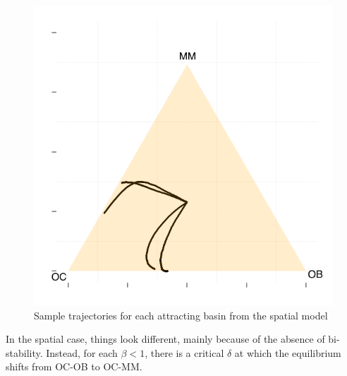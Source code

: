 \documentclass[12pt]{report}
\begin{document}
\begin{figure}[H]
\centering
\includegraphics[width = 0.4 \linewidth]{Diagrams/dingli_trajectories}
\caption{Sample trajectories for each attracting basin from the spatial model}
\end{figure}
In the spatial case, things look different, mainly because of the absence of bi-stability. Instead, for each $\beta < 1$, there is a critical $\delta$ at which the equilibrium shifts from OC-OB to OC-MM.  

\pagebreak
\end{document}
